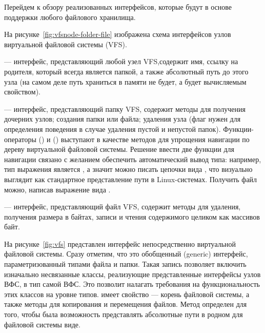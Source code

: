 
    Перейдем к обзору реализованных интерфейсов, которые будут в основе поддержки любого файлового хранилища.
    
    На рисунке~\ref{fig:vfsnode-folder-file} изображена схема интерфейсов узлов виртуальной файловой системы (VFS). 
    
     --- интерфейс, представляющий любой узел VFS,содержит имя, ссылку на родителя, который всегда является папкой, а также абсолютный путь до этого узла (на самом деле путь храниться в памяти не будет, а будет вычисляемым свойством\cite{kotlin-computed-property}).

     --- интерфейс, представляющий папку VFS, содержит методы для получения дочерних узлов; создания папки или файла; удаления узла (флаг  нужен для определения поведения в случае удаления пустой и непустой папок). Функции-операторы  (\code{/}) и  (\code{\%}) выступают в качестве методов для упрощения навигации по дереву виртуальной файловой системы. Решение ввести две функции для навигации связано с желанием обеспечить автоматический вывод типа: например, тип выражения  является , а значит можно писать цепочки вида , что визуально выглядит как стандартное представление пути в Linux-системах. Получить файл можно, написав выражение вида .
    
     --- интерфейс, представляющий файл VFS, содержит методы для удаления, получения размера в байтах, записи и чтения содержимого целиком как массивов байт.

    На рисунке~\ref{fig:vfs} представлен интерфейс непосредственно виртуальной файловой системы. Сразу отметим, что это обобщенный (generic) интерфейс, параметризованный типами файла и папки. Такая запись позволяет включить изначально несвязанные классы, реализующие представленные интерфейсы узлов ВФС, в тип самой ВФС. Это позволит налагать требования на функциональность этих классов на уровне типов.  имеет свойство  --- корень файловой системы, а также методы для копирования и перемещения файлов. Метод  определен для того, чтобы была возможность представлять абсолютные пути в родном для файловой системы виде.

